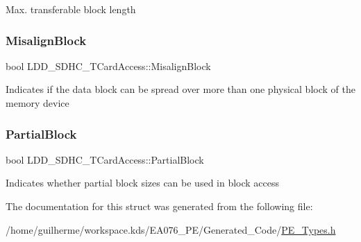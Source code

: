Max. transferable block length \mbox{\label{struct_l_d_d___s_d_h_c___t_card_access_aa56e65353fd03ffdbd8cc8d19537b621}} 
\subsubsection{\texorpdfstring{Misalign\+Block}{MisalignBlock}}
{\footnotesize\ttfamily bool L\+D\+D\+\_\+\+S\+D\+H\+C\+\_\+\+T\+Card\+Access\+::\+Misalign\+Block}

Indicates if the data block can be spread over more than one physical block of the memory device \mbox{\label{struct_l_d_d___s_d_h_c___t_card_access_a9d78668915e934548a04351b20ec2d0a}} 
\subsubsection{\texorpdfstring{Partial\+Block}{PartialBlock}}
{\footnotesize\ttfamily bool L\+D\+D\+\_\+\+S\+D\+H\+C\+\_\+\+T\+Card\+Access\+::\+Partial\+Block}

Indicates whether partial block sizes can be used in block access 

The documentation for this struct was generated from the following file\+:\begin{DoxyCompactItemize}
\item 
/home/guilherme/workspace.\+kds/\+E\+A076\+\_\+\+P\+E/\+Generated\+\_\+\+Code/\hyperlink{_p_e___types_8h}{P\+E\+\_\+\+Types.\+h}\end{DoxyCompactItemize}
